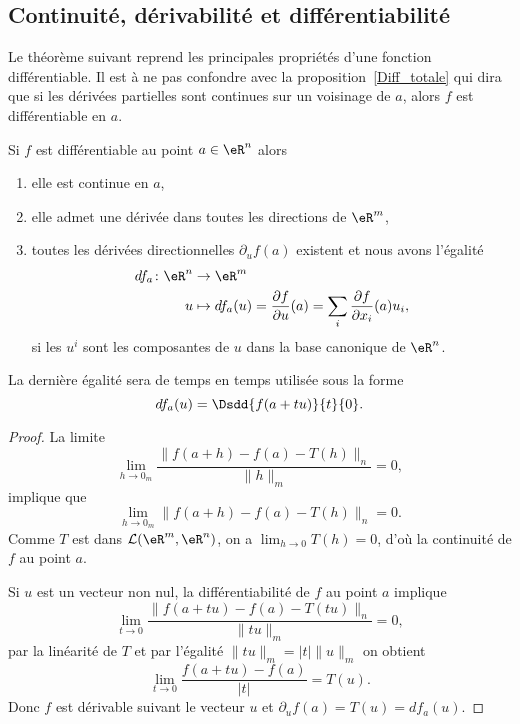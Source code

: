 \subsection{Continuité, dérivabilité et différentiabilité}

Le théorème suivant reprend les principales propriétés d'une fonction différentiable. Il est à ne pas confondre avec la proposition~\ref{Diff_totale} qui dira que si les dérivées partielles sont continues sur un voisinage de $a$, alors $f$ est différentiable en $a$.
\begin{proposition}\label{diff1}\label{ThoRapPropDiffSi}
    Si $f$ est différentiable au point $a\in \eR^n$ alors
    \begin{enumerate}
        \item
            elle est continue en \( a\),
        \item
            elle admet une dérivée dans toutes les directions de \( \eR^m\),
\item  toutes les dérivées directionnelles $\partial_uf(a)$ existent et nous avons l'égalité
\begin{equation}        \label{EqDiffPartRap}
    \begin{aligned}
        df_a\colon \eR^n&\to \eR^m \\
        u&\mapsto df_a(u)=\frac{ \partial f }{ \partial u }(a)=\sum_i \frac{ \partial f }{ \partial x_i }(a)u_i,
    \end{aligned}
\end{equation}
si les $u^i$ sont les composantes de $u$ dans la base canonique de $\eR^n$.

    \end{enumerate}
\end{proposition}

La dernière égalité sera de temps en temps utilisée sous la forme
\begin{equation}    \label{EqOWQSoMA}
    df_a(u)=\Dsdd{ f(a+tu) }{t}{0}.
\end{equation}

\begin{proof}
  La limite
\[
\lim_{h\to 0_m}\frac{\|f(a+h)-f(a)-T(h)\|_n}{\|h\|_m}=0,
\]
implique que
 \[
\lim_{h\to 0_m}\|f(a+h)-f(a)-T(h)\|_n=0.
\]
Comme $T$ est dans $\mathcal{L}(\eR^m,\eR^n)$, on a $\lim_{h\to 0}T(h)=0$, d'où la continuité de $f$ au point $a$.

Si $u$ est un vecteur non nul, la différentiabilité de $f$ au point $a$ implique
\[
\lim_{t\to 0}\frac{\|f(a+tu)-f(a)-T(tu)\|_n}{\|tu\|_m}=0,
\]
par la linéarité de $T$ et par l'égalité $\|tu\|_m=|t|\|u\|_m$ on obtient
\[
\lim_{t\to 0}\frac{f(a+tu)-f(a)}{|t|}= T(u).
\]
Donc $f$ est dérivable suivant le vecteur $u$ et $\partial_uf(a)=T(u)=df_a(u)$.
\end{proof}

